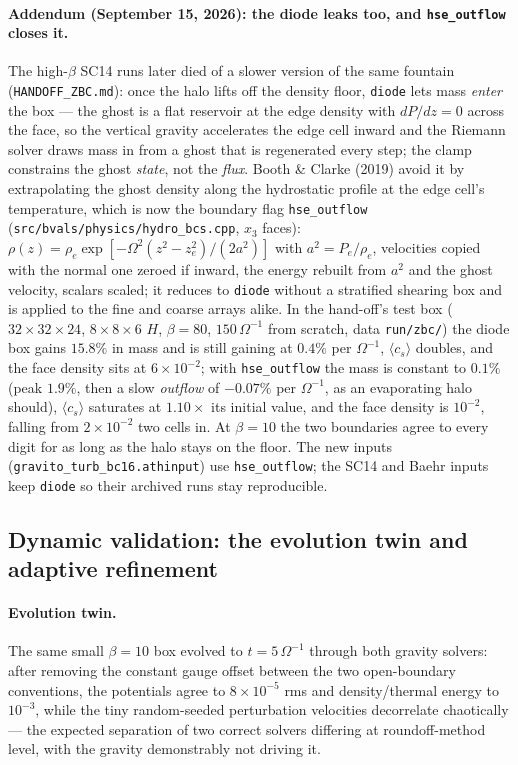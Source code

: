 \documentclass[11pt]{article}
\newcommand{\code}[1]{\texttt{#1}}
\newcommand{\file}[1]{\texttt{#1}}
\newcommand{\Om}{\Omega}
\begin{document}
\paragraph{Addendum (September 15, 2026): the diode leaks too, and
\code{hse\_outflow} closes it.} The high-$\beta$ SC14 runs later died of a slower
version of the same fountain (\file{HANDOFF\_ZBC.md}): once the halo lifts off the
density floor, \code{diode} lets mass \emph{enter} the box --- the ghost is a flat
reservoir at the edge density with $dP/dz = 0$ across the face, so the vertical
gravity accelerates the edge cell inward and the Riemann solver draws mass in from a
ghost that is regenerated every step; the clamp constrains the ghost \emph{state}, not
the \emph{flux}. Booth \& Clarke (2019) avoid it by extrapolating the ghost density
along the hydrostatic profile at the edge cell's temperature, which is now the
boundary flag \code{hse\_outflow} (\file{src/bvals/physics/hydro\_bcs.cpp}, $x_3$
faces): $\rho(z) = \rho_e\exp[-\Om^2(z^2 - z_e^2)/(2a^2)]$ with $a^2 = P_e/\rho_e$,
velocities copied with the normal one zeroed if inward, the energy rebuilt from $a^2$
and the ghost velocity, scalars scaled; it reduces to \code{diode} without a
stratified shearing box and is applied to the fine and coarse arrays alike. In the
hand-off's test box ($32\times32\times24$, $8\times8\times6$ $H$, $\beta = 80$,
$150\,\Om^{-1}$ from scratch, data \file{run/zbc/}) the diode box gains $15.8\%$
in mass and is still gaining at $0.4\%$ per $\Om^{-1}$, $\langle c_s\rangle$
doubles, and the face density sits at $6\times10^{-2}$; with \code{hse\_outflow}
the mass is constant to $0.1\%$ (peak $1.9\%$, then a slow \emph{outflow} of
$-0.07\%$ per $\Om^{-1}$, as an evaporating halo should), $\langle c_s\rangle$
saturates at $1.10\times$ its initial value, and the face density is $10^{-2}$,
falling from $2\times10^{-2}$ two cells in. At $\beta = 10$ the two boundaries agree
to every digit for as long as the halo stays on the floor. The new inputs
(\file{gravito\_turb\_bc16.athinput}) use \code{hse\_outflow}; the SC14 and Baehr
inputs keep \code{diode} so their archived runs stay reproducible.

\subsection{Dynamic validation: the evolution twin and adaptive refinement}

\paragraph{Evolution twin.} The same small $\beta{=}10$ box evolved to
$t = 5\,\Om^{-1}$ through both gravity solvers: after removing the constant gauge
offset between the two open-boundary conventions, the potentials agree to
$8\times10^{-5}$ rms and density/thermal energy to $10^{-3}$, while the tiny
random-seeded perturbation velocities decorrelate chaotically --- the expected
separation of two correct solvers differing at roundoff-method level, with the
gravity demonstrably not driving it.
\end{document}
